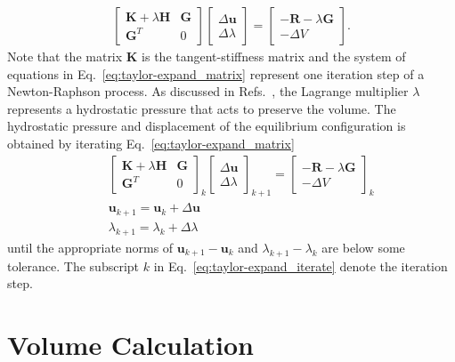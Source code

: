 \documentclass[12pt,aps,pre]{revtex4}
\begin{document}
%
\begin{eqnarray}
\begin{bmatrix}
\textbf{K} + \lambda \textbf{H} & \textbf{G} \\
\textbf{G}^T & 0 
\end{bmatrix}
%
\begin{bmatrix}
\Delta \textbf{u} \\ \Delta \lambda
\end{bmatrix}
%
= \begin{bmatrix}
-\textbf{R}-\lambda \textbf{G} \\
- \Delta V 
\end{bmatrix}.
\label{eq:taylor-expand_matrix}
\end{eqnarray}
%
Note that the matrix \textbf{K} is the tangent-stiffness matrix and the system of equations in Eq.\ \eqref{eq:taylor-expand_matrix} represent one iteration step of a Newton-Raphson process. As discussed in Refs.\ \cite{Hirota:2000jw,Lai:2013fp}, the Lagrange multiplier $\lambda$ represents a hydrostatic pressure that acts to preserve the volume. The hydrostatic pressure and displacement of the equilibrium configuration is obtained by iterating Eq.\ \eqref{eq:taylor-expand_matrix}
%
\begin{eqnarray}
&&\begin{bmatrix}
\textbf{K} + \lambda \textbf{H} & \textbf{G} \\
\textbf{G}^T & 0 
\end{bmatrix}_k
%
\begin{bmatrix}
\Delta \textbf{u} \\ \Delta \lambda
\end{bmatrix}_{k+1}
%
= \begin{bmatrix}
-\textbf{R}-\lambda \textbf{G} \\
- \Delta V 
\end{bmatrix}_k \nonumber\\
%
&&\textbf{u}_{k+1} = \textbf{u}_k + \Delta \textbf{u} \nonumber\\
%
&&\lambda_{k+1} = \lambda_k + \Delta \lambda
\label{eq:taylor-expand_iterate}
\end{eqnarray}
%
until the appropriate norms of $\textbf{u}_{k+1} - \textbf{u}_k$ and $\lambda_{k+1} - \lambda_k$ are below some tolerance. The subscript $k$ in Eq.\ \eqref{eq:taylor-expand_iterate} denote the iteration step.

\section{Volume Calculation}
\end{document}
